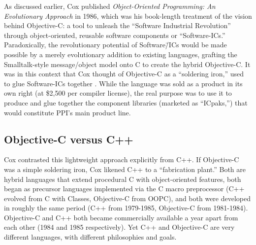 \documentclass[acmsmall]{acmart}\settopmatter{}
\begin{document}
As discussed earlier, Cox published \emph{Object-Oriented Programming: An Evolutionary Approach} in 1986, which was his book-length treatment of the vision behind Objective-C: a tool to unleash the ``Software Industrial Revolution'' through object-oriented, reusable software components or ``Software-ICs.''  \citep{cox_object-oriented_1986} Paradoxically, the revolutionary potential of Software\=/ICs would be made possible by a merely evolutionary addition to existing languages, grafting the Smalltalk-style message/object model onto C to create the hybrid Objective-C. It was in this context that Cox thought of Objective-C as a ``soldering iron,'' used to glue Software-ICs together \citep[260]{biancuzzi_objective-c_2009}. While the language was sold as a product in its own right (at \$2,500 per compiler license), the real purpose was to use it to produce and glue together the component libraries (marketed as ``ICpaks,'') that would constitute PPI's main product line.
\subsection{Objective-C versus C++}
\label{subsec-ObjCvC++}
Cox contrasted this lightweight approach explicitly from C++. If Objective-C was a simple soldering iron, Cox likened C++ to a ``fabrication plant.'' \citetext{\citealp[29--30]{cox_oral_2016}, \citealp[263]{biancuzzi_objective-c_2009}}  Both are hybrid languages that extend procedural C with object-oriented features, both began as precursor languages implemented via the C macro preprocessor (C++ evolved from C with Classes, Objective-C from OOPC), and both were developed in roughly the same period (C++ from 1979-1985, Objective-C from 1981-1984). Objective-C and C++ both became commercially available a year apart from each other (1984 and 1985 respectively). Yet C++ and Objective-C are very different languages, with different philosophies and goals. 
\end{document}
